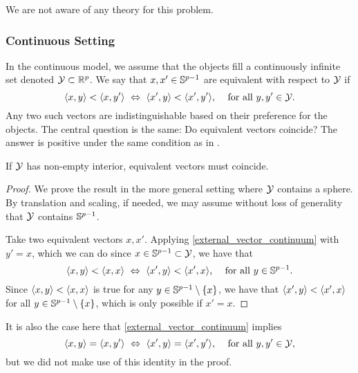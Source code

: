 \documentclass[twoside, 11pt]{article}
\begin{document}
We are not aware of any theory for this problem. 

\subsubsection{Continuous Setting}
\label{sec:external vector continuum}
In the continuous model, we assume that the objects fill a continuously infinite set denoted $\mathcal{Y} \subset \mathbb{R}^p$. 
We say that $x, x' \in \mathbb{S}^{p-1}$ are equivalent with respect to $\mathcal{Y}$ if  
\begin{equation}
\label{external_vector_continuum}
\text{$\langle x, y\rangle < \langle x, y'\rangle \ \Leftrightarrow \  \langle x', y\rangle < \langle x', y'\rangle$, \quad for all $y, y' \in \mathcal{Y}$.}
\end{equation}
Any two such vectors are indistinguishable based on their preference for the objects. The central question is the same: Do equivalent vectors coincide? The answer is positive under the same condition as in .

\begin{theorem}
\label{thm:external_vector}
If $\mathcal{Y}$ has non-empty interior, equivalent vectors must coincide. 
\end{theorem}

\begin{proof}
We prove the result in the more general setting where $\mathcal{Y}$ contains a sphere. 
By translation and scaling, if needed, we may assume without loss of generality that $\mathcal{Y}$ contains $\mathbb{S}^{p-1}$. 

Take two equivalent vectors $x,x'$. 
Applying \eqref{external_vector_continuum} with $y' = x$, which we can do since $x \in \mathbb{S}^{p-1} \subset \mathcal{Y}$, we have that 
\begin{equation}
\text{$\langle x, y\rangle < \langle x, x\rangle \ \Leftrightarrow \  \langle x', y\rangle < \langle x', x\rangle$, \quad for all $y \in \mathbb{S}^{p-1}$.}
\end{equation}
Since $\langle x, y\rangle < \langle x, x\rangle$ is true for any $y \in \mathbb{S}^{p-1} \setminus \{x\}$, we have that $\langle x', y\rangle < \langle x', x\rangle$ for all $y \in \mathbb{S}^{p-1} \setminus \{x\}$, which is only possible if $x' = x$.
\end{proof}

It is also the case here that \eqref{external_vector_continuum} implies
\begin{equation}
\label{external_vector_continuum_equal}
\text{$\langle x, y\rangle = \langle x, y'\rangle \ \Leftrightarrow \  \langle x', y\rangle = \langle x', y'\rangle$, \quad for all $y, y' \in \mathcal{Y}$,}
\end{equation}
but we did not make use of this identity in the proof.
\end{document}

